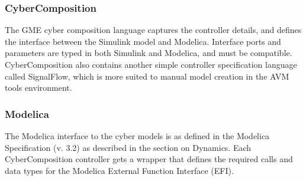 \subsubsection{CyberComposition}

The GME cyber composition language captures the controller details, and defines the interface between the Simulink model and Modelica.  Interface ports and parameters are typed in both Simulink and Modelica, and must be compatible.
CyberComposition also contains another simple controller specification language called SignalFlow, which is more
suited to manual model creation in the AVM tools environment.

\subsubsection{Modelica}

The Modelica interface to the cyber models is as defined in the Modelica Specification (v. 3.2) as described in
the section on Dynamics.  Each CyberComposition controller gets a wrapper that defines the required calls and
data types for the Modelica External Function Interface (EFI).  


